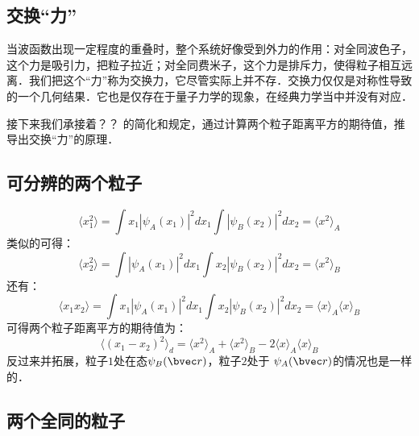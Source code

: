 
\subsection{交换“力”}
当波函数出现一定程度的重叠时，整个系统好像受到外力的作用：对全同波色子，这个力是吸引力，把粒子拉近；对全同费米子，这个力是排斥力，使得粒子相互远离．我们把这个“力”称为交换力，它尽管实际上并不存．交换力仅仅是对称性导致的一个几何结果．它也是仅存在于量子力学的现象，在经典力学当中并没有对应．

接下来我们承接着？？ 的简化和规定，通过计算两个粒子距离平方的期待值，推导出交换“力”的原理．

\subsection{可分辨的两个粒子}
\begin{equation}
\langle x_1^2\rangle = \int x_1|\psi_A(x_1)|^2dx_1\int |\psi_B(x_2)|^2dx_2=\langle x^2\rangle_A
\end{equation}
类似的可得：
\begin{equation}
\langle x_2^2\rangle = \int |\psi_A(x_1)|^2dx_1\int x_2 |\psi_B(x_2)|^2dx_2=\langle x^2\rangle_B
\end{equation}
还有：
\begin{equation}
\langle x_1x_2\rangle = \int  x_1|\psi_A(x_1)|^2dx_1\int x_2 |\psi_B(x_2)|^2dx_2=\langle x\rangle_A\langle x\rangle_B
\end{equation}
可得两个粒子距离平方的期待值为：
\begin{equation}\label{ExchF_eq7}
\langle (x_1-x_2)^2\rangle_d=\langle x^2\rangle_A+\langle x^2\rangle_B-2\langle x\rangle_A\langle x\rangle_B
\end{equation}
反过来并拓展，粒子$ 1 $处在态$\psi_B(\bvec r)$，粒子$ 2 $处于 $\psi_A(\bvec r)$的情况也是一样的．

\subsection{两个全同的粒子}

